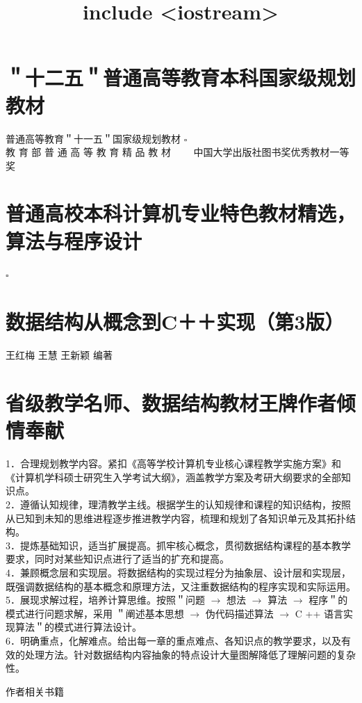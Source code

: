 \documentclass[10pt]{article}
\title{include <iostream>}
\author{}
\date{}
\begin{document}
\maketitle
\section*{＂十二五＂普通高等教育本科国家级规划教材}
普通高等教育＂十一五＂国家级规划教材 $\square$\\
教 育 部 普 通 高 等 教 育 精 品 教 材 $\qquad$中国大学出版社图书奖优秀教材一等奖 $\qquad$

\section*{普通高校本科计算机专业特色教材精选，算法与程序设计}
$\square$

\section*{数据结构从概念到C＋＋实现（第3版）}
王红梅 王慧 王新颖 编著

\section*{省级教学名师、数据结构教材王牌作者倾情奉献}
1．合理规划教学内容。紧扣《高等学校计算机专业核心课程教学实施方案》和《计算机学科硕士研究生入学考试大纲》，涵盖教学方案及考研大纲要求的全部知识点。\\
2．遵循认知规律，理清教学主线。根据学生的认知规律和课程的知识结构，按照从已知到未知的思维进程逐步推进教学内容，梳理和规划了各知识单元及其拓扑结构。\\
3．提炼基础知识，适当扩展提高。抓牢核心概念，贯彻数据结构课程的基本教学要求，同时对某些知识点进行了适当的扩充和提高。\\
4．兼顾概念层和实现层。将数据结构的实现过程分为抽象层、设计层和实现层，既强调数据结构的基本概念和原理方法，又注重数据结构的程序实现和实际运用。\\
5．展现求解过程，培养计算思维。按照＂问题 $\rightarrow$ 想法 $\rightarrow$ 算法 $\rightarrow$ 程序＂的模式进行问题求解，采用 ＂阐述基本思想 $\rightarrow$ 伪代码描述算法 $\rightarrow$ C ++ 语言实现算法＂的模式进行算法设计。\\
6．明确重点，化解难点。给出每一章的重点难点、各知识点的教学要求，以及有效的处理方法。针对数据结构内容抽象的特点设计大量图解降低了理解问题的复杂性。

作者相关书籍
\end{document}
